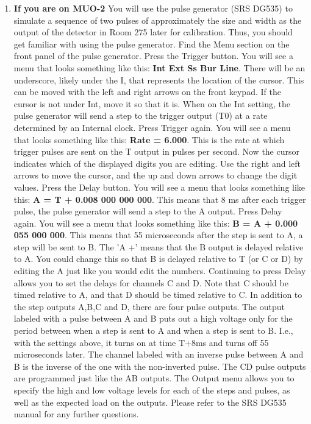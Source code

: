 \documentclass{../lab}
\begin{document}
\begin{enumerate}
    \item \textbf{If you are on MUO-2} You will use the pulse generator (SRS DG535) to simulate a sequence of two pulses of approximately the size and width as the output of the detector in Room 275 later for calibration. Thus, you should get familiar with using the pulse generator. Find the Menu section on the front panel of the pulse generator. Press the Trigger button. You will see a menu that looks something like this: \textbf{Int Ext Ss Bur Line}. There will be an underscore, likely under the I,  that represents the location of the cursor. This can be moved with the left and right arrows on the front keypad. If the cursor is not under Int, move it so that it is. When on the Int setting, the pulse generator will send a step to the trigger output (T0) at a rate determined by an Internal clock. Press Trigger again. You will see a menu that looks something like this: \textbf{Rate = 6.000}. This is the rate at which trigger pulses are sent on the T output in pulses per second. Now the cursor indicates which of the displayed digits you are editing. Use the right and left arrows to move the cursor, and the up and down arrows to change the digit values. Press the Delay button. You will see a menu that looks something like this: \textbf{A = T + 0.008 000 000 000}. This means that 8 ms after each trigger pulse, the pulse generator will send a step to the A output. Press Delay again. You will see a menu that looks something like this: \textbf{B = A + 0.000 055 000 000}. This means that 55 microseconds after the step is sent to A, a step will be sent to B. The 'A +' means that the B output is delayed relative to A. You could change this so that B is delayed relative to T (or C or D) by editing the A just like you would edit the numbers. Continuing to press Delay allows you to set the delays for channels C and D. Note that C should be timed relative to A, and that D should be timed relative to C. In addition to the step outputs A,B,C and D, there are four pulse outputs. The output labeled with a pulse between A and B puts out a high voltage only for the period between when a step is sent to A and when a step is sent to B. I.e., with the settings above, it turns on at time T+8ms and turns off 55 microseconds later. The channel labeled with an inverse pulse between A and B is the inverse of the one with the non-inverted pulse. The CD pulse outputs are programmed just like the AB outputs. The Output menu allows you to specify the high and low voltage levels for each of the steps and pulses, as well as the expected load on the outputs. Please refer to the SRS DG535 manual for any further questions. 

\end{enumerate}
\end{document}
